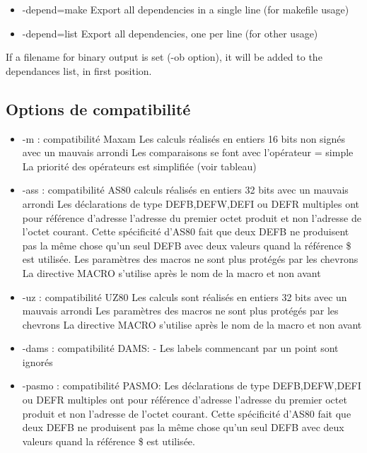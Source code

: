 \begin{xen}
  \begin{itemize}
    \item -depend=make  Export all dependencies in a single line (for makefile usage)
    \item -depend=list  Export all dependencies, one per line (for other usage)
  \end{itemize}
  If a filename for binary output is set (-ob option), it will be added to the dependances list, in first position.
\end{xen}

\begin{xfr}
\subsection{Options de compatibilité}
\begin{itemize}
\item -m : compatibilité Maxam
 \subitem Les calculs réalisés en entiers 16 bits non signés avec un mauvais arrondi
 \subitem Les comparaisons se font avec l'opérateur = simple
 \subitem La priorité des opérateurs est simplifiée (voir tableau)

\item -ass : compatibilité AS80
 \subitem calculs réalisés en entiers 32 bits avec un mauvais arrondi
 \subitem Les déclarations de type DEFB,DEFW,DEFI ou DEFR multiples ont pour référence d'adresse l'adresse du premier octet produit et non l'adresse de l'octet courant. Cette spécificité d'AS80 fait que deux DEFB ne produisent pas la même chose qu'un seul DEFB avec deux valeurs quand la référence \$ est utilisée.
 \subitem Les paramètres des macros ne sont plus protégés par les chevrons {}
 \subitem La directive MACRO s'utilise après le nom de la macro et non avant

\item -uz : compatibilité UZ80
 \subitem Les calculs sont réalisés en entiers 32 bits avec un mauvais arrondi
 \subitem Les paramètres des macros ne sont plus protégés par les chevrons {}
 \subitem La directive MACRO s'utilise après le nom de la macro et non avant

\item -dams : compatibilité DAMS:
\subitem - Les labels commencant par un point sont ignorés

\item -pasmo : compatibilité PASMO:
\subitem Les déclarations de type DEFB,DEFW,DEFI ou DEFR multiples ont pour référence d'adresse l'adresse du premier octet produit et non l'adresse de l'octet courant. Cette spécificité d'AS80 fait que deux DEFB ne produisent pas la même chose qu'un seul DEFB avec deux valeurs quand la référence \$ est utilisée.
\end{itemize}

\end{xfr}

